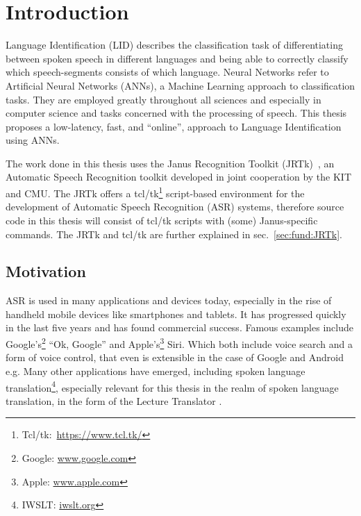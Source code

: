 
\chapter{Introduction}
\label{ch:Introduction}
Language Identification (LID) describes the classification task of differentiating between spoken speech in different languages and being able to correctly classify which speech-segments consists of which language.  Neural Networks refer to Artificial Neural Networks (ANNs), a Machine Learning approach to classification tasks. They are employed greatly throughout all sciences and especially in computer science and tasks concerned with the processing of speech. This thesis proposes a low-latency, fast, and ``online'', approach to Language Identification using ANNs.

The work done in this thesis uses the Janus Recognition Toolkit (JRTk)~\cite{woszczyna1994janus}, an Automatic Speech Recognition toolkit developed in joint cooperation by the KIT and CMU. The JRTk offers a tcl/tk\footnote{Tcl/tk:~\url{https://www.tcl.tk/}} script-based environment for the development of Automatic Speech Recognition (ASR) systems, therefore source code in this thesis will consist of tcl/tk scripts with (some) Janus-specific commands. The JRTk and tcl/tk are further explained in sec.~\ref{sec:fund:JRTk}.

\section{Motivation}
\label{sec:Introduction:Motivation}
ASR is used in many applications and devices today, especially in the rise of handheld mobile devices like smartphones and tablets. It has progressed quickly in the last five years and has found commercial success. Famous examples include Google's\footnote{Google: \url{www.google.com}} ``Ok, Google'' and Apple's\footnote{Apple: \url{www.apple.com}} Siri. Which both include voice search\cite{franz2008voice} and a form of voice control, that even is extensible in the case of Google and Android e.g\cite{voicecontrol2014}. Many other applications have emerged, including spoken language translation\footnote{IWSLT: \url{iwslt.org}}, especially relevant for this thesis in the realm of spoken language translation, in the form of the Lecture Translator\cite{lecturetranslator2016} .

